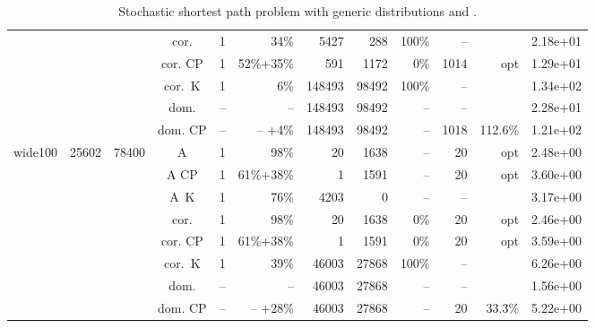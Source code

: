 \documentclass[11pt]{amsart}
\newenvironment{outdent}
{\begin{list}{}{\leftmargin-2cm\rightmargin\leftmargin}\centering\item\relax}
{\end{list}\ignorespacesafterend}
\theoremstyle{plain}
\theoremstyle{remark}
\begin{document}
\begin{table}
\begin{outdent}
\begin{small}
\begin{tabular}{|l|rrc|rr|rrr|rr|r|}
&&&cor. & 1 & 34\% &5427 & 288 & 100\% & -- & & 2.18e+01 \\
&&&cor. CP & 1 & 52\%+35\% &591 & 1172 & 0\% &1014 & opt & 1.29e+01 \\
&&&cor.~K & 1 & 6\% &148493 & 98492 & 100\% & -- & & 1.34e+02 \\
&&&dom. & -- & --  &148493 & 98492 & -- & -- & & 2.28e+01 \\
&&&dom. CP & -- & -- +4\% &148493 & 98492 & -- &1018 & 112.6\% & 1.21e+02 \\
\hline
wide100 & 25602 & 78400 & A & 1 & 98\% &20 & 1638 & -- &20 & opt & 2.48e+00 \\
&&&A CP & 1 & 61\%+38\% &1 & 1591 & -- &20 & opt & 3.60e+00 \\
&&&A~K & 1 & 76\% &4203 & 0 & -- & -- & & 3.17e+00 \\
&&&cor. & 1 & 98\% &20 & 1638 & 0\% &20 & opt & 2.46e+00 \\
&&&cor. CP & 1 & 61\%+38\% &1 & 1591 & 0\% &20 & opt & 3.59e+00 \\
&&&cor.~K & 1 & 39\% &46003 & 27868 & 100\% & -- & & 6.26e+00 \\
&&&dom. & -- & --  &46003 & 27868 & -- & -- & & 1.56e+00 \\
&&&dom. CP & -- & -- +28\% &46003 & 27868 & -- &20 & 33.3\% & 5.22e+00 \\
\hline
\end{tabular}
\end{small}
\end{outdent}
\caption{Stochastic shortest path problem with generic distributions and .}
\label{tab:dctDist}
\end{table}
\end{document}

